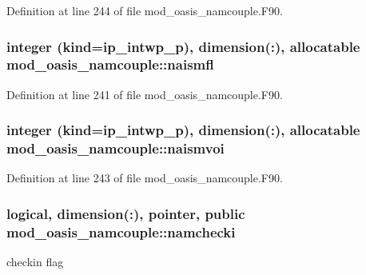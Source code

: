 Definition at line 244 of file mod\+\_\+oasis\+\_\+namcouple.\+F90.

\hypertarget{classmod__oasis__namcouple_a4a7cad8814c7811b364fd7d70b60b576}{
\subsubsection[{naismfl}]{\setlength{\rightskip}{0pt plus 5cm}integer (kind=ip\+\_\+intwp\+\_\+p), dimension(\+:), allocatable mod\+\_\+oasis\+\_\+namcouple\+::naismfl\hspace{0.3cm}{\ttfamily [private]}}}\label{classmod__oasis__namcouple_a4a7cad8814c7811b364fd7d70b60b576}


Definition at line 241 of file mod\+\_\+oasis\+\_\+namcouple.\+F90.

\hypertarget{classmod__oasis__namcouple_ae3d7c72b2f2f3ece9583cc0b25edbaba}{
\subsubsection[{naismvoi}]{\setlength{\rightskip}{0pt plus 5cm}integer (kind=ip\+\_\+intwp\+\_\+p), dimension(\+:), allocatable mod\+\_\+oasis\+\_\+namcouple\+::naismvoi\hspace{0.3cm}{\ttfamily [private]}}}\label{classmod__oasis__namcouple_ae3d7c72b2f2f3ece9583cc0b25edbaba}


Definition at line 243 of file mod\+\_\+oasis\+\_\+namcouple.\+F90.

\hypertarget{classmod__oasis__namcouple_a7c88a329c97aea020e9b135bdca8d160}{
\subsubsection[{namchecki}]{\setlength{\rightskip}{0pt plus 5cm}logical, dimension(\+:), pointer, public mod\+\_\+oasis\+\_\+namcouple\+::namchecki}}\label{classmod__oasis__namcouple_a7c88a329c97aea020e9b135bdca8d160}


checkin flag 



